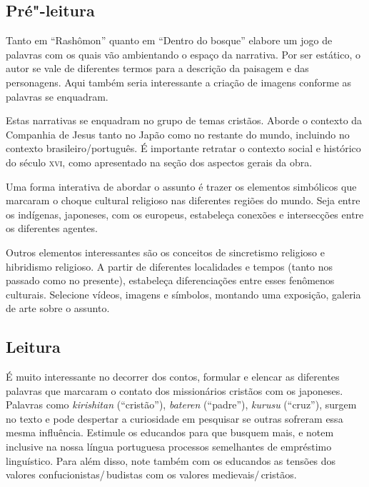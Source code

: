\documentclass[12pt]{extarticle}
\begin{document}


\subsection{Pré"-leitura}

Tanto em ``Rashômon'' quanto em ``Dentro do bosque'' elabore um jogo de palavras com os
quais vão ambientando o espaço da narrativa. Por ser estático, o autor se vale
de diferentes termos para a descrição da paisagem e das personagens. Aqui
também seria interessante a criação de imagens conforme as palavras se
enquadram.

Estas narrativas se enquadram no grupo de temas cristãos. Aborde o
contexto da Companhia de Jesus tanto no Japão como no restante do mundo,
incluindo no contexto brasileiro/português. É importante retratar o contexto
social e histórico do século \textsc{xvi}, como apresentado na seção dos
aspectos gerais da obra.

Uma forma interativa de abordar o assunto é trazer os elementos simbólicos que
marcaram o choque cultural religioso nas diferentes regiões do mundo. Seja
entre os indígenas, japoneses, com os europeus, estabeleça conexões e
intersecções entre os diferentes agentes.

Outros elementos interessantes são os conceitos de sincretismo religioso e
hibridismo religioso. A partir de diferentes localidades e tempos (tanto nos
passado como no presente), estabeleça diferenciações entre esses fenômenos
culturais. Selecione vídeos, imagens e símbolos, montando uma exposição,
galeria de arte sobre o assunto.

\subsection{Leitura}

É muito interessante no decorrer dos contos, formular e elencar as diferentes
palavras que marcaram o contato dos missionários cristãos com os japoneses.
Palavras como \textit{kirishitan} (``cristão''), \textit{bateren} (``padre''), 
\textit{kurusu} (``cruz''),
surgem no texto e pode despertar a curiosidade em pesquisar se outras sofreram
essa mesma influência.  Estimule os educandos para que busquem mais, e notem
inclusive na nossa língua portuguesa processos semelhantes de empréstimo
linguístico. Para além disso, note também com os educandos as tensões dos
valores confucionistas/\,budistas com os valores medievais/\,cristãos.
\end{document}
